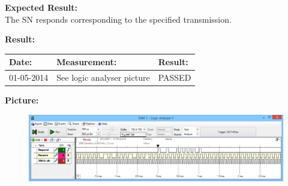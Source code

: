 \begin{figure}[H]
	\centering
\end{figure}

\textbf{Expected Result:}\\
The SN responds corresponding to the specified transmission.


\textbf{Result:}
\begin{table}[H]
	\centering
	\begin{tabular}{|p{2cm}|p{4.2cm}|p{2cm}|}\hline
		\textbf{Date:} & \textbf{Measurement:} & \textbf{Result:} \\ \hline
	 	01-05-2014 & See logic analyser picture & PASSED \\ \hline
	\end{tabular}
\end{table}

\textbf{Picture:}
\begin{figure}[H]
	\centering
	\includegraphics[width=1\textwidth]{billeder/SN_case6_communication}
\end{figure}


